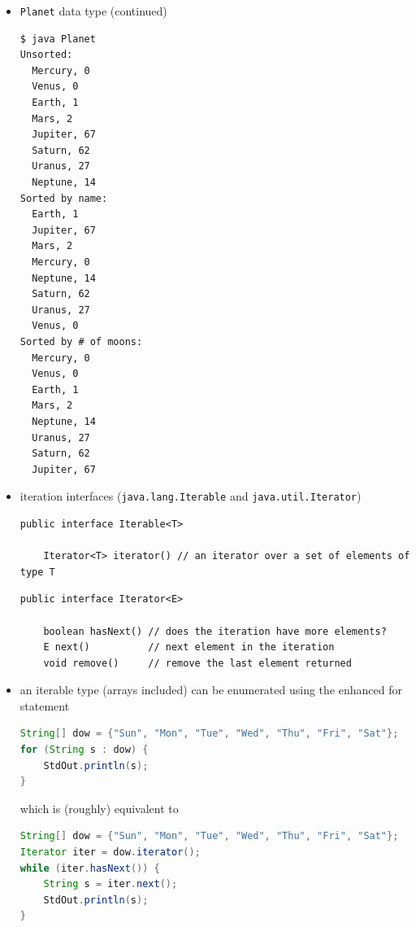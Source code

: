 \documentclass[8pt,a4paper,compress]{beamer}
\begin{document}
\begin{frame}[fragile]
\begin{itemize}
\item \lstinline{Planet} data type (continued)
\begin{lstlisting}[language={}]
$ java Planet
Unsorted:
  Mercury, 0
  Venus, 0
  Earth, 1
  Mars, 2
  Jupiter, 67
  Saturn, 62
  Uranus, 27
  Neptune, 14
Sorted by name:
  Earth, 1
  Jupiter, 67
  Mars, 2
  Mercury, 0
  Neptune, 14
  Saturn, 62
  Uranus, 27
  Venus, 0
Sorted by # of moons:
  Mercury, 0
  Venus, 0
  Earth, 1
  Mars, 2
  Neptune, 14
  Uranus, 27
  Saturn, 62
  Jupiter, 67
\end{lstlisting}
\end{itemize}
\end{frame}

\begin{frame}[fragile]
\begin{itemize}
\item iteration interfaces (\lstinline{java.lang.Iterable} and \lstinline{java.util.Iterator})
\begin{lstlisting}[language={},mathescape]
public interface Iterable<T>

    Iterator<T> iterator() // an iterator over a set of elements of type T
\end{lstlisting}

\begin{lstlisting}[language={},mathescape]
public interface Iterator<E>

    boolean hasNext() // does the iteration have more elements?
    E next()          // next element in the iteration
    void remove()     // remove the last element returned
\end{lstlisting}

\item an iterable type (arrays included) can be enumerated using the enhanced for statement
\begin{lstlisting}[language=Java]
String[] dow = {"Sun", "Mon", "Tue", "Wed", "Thu", "Fri", "Sat"};
for (String s : dow) {
    StdOut.println(s);
}
\end{lstlisting}
which is (roughly) equivalent to
\begin{lstlisting}[language=Java]
String[] dow = {"Sun", "Mon", "Tue", "Wed", "Thu", "Fri", "Sat"};
Iterator iter = dow.iterator();
while (iter.hasNext()) {
    String s = iter.next();
    StdOut.println(s);
}
\end{lstlisting}
\end{itemize}
\end{frame}
\end{document}

